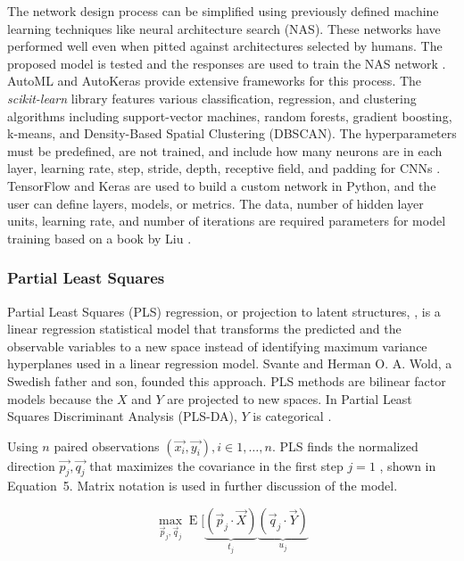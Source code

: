 \documentclass[sn-mathphys-num]{sn-jnl}%
\begin{document}
The network design process can be simplified using previously defined machine learning techniques like neural architecture search (NAS). These networks have performed well even when pitted against architectures selected by humans. The proposed model is tested and the responses are used to train the NAS network \cite{zoph2016neural}. AutoML and AutoKeras \cite{jin2019auto} provide extensive frameworks for this process. The \textit{scikit-learn} library features various classification, regression, and clustering algorithms including support-vector machines, random forests, gradient boosting, k-means, and Density-Based Spatial Clustering (DBSCAN). The hyperparameters must be predefined, are not trained, and include how many neurons are in each layer, learning rate, step, stride, depth, receptive field, and padding for CNNs \cite{claesen2015hyperparameter}. TensorFlow and Keras are used to build a custom network in Python, and the user can define layers, models, or metrics. The data, number of hidden layer units, learning rate, and number of iterations are required parameters for model training based on a book by Liu \cite{liu2020python}.

\subsubsection{Partial Least Squares}

Partial Least Squares (PLS) regression, or projection to latent structures, \cite{wold2001pls, abdi2010partial}, is a linear regression statistical model that transforms the predicted and the observable variables to a new space instead of identifying maximum variance hyperplanes used in a linear regression model. Svante and Herman O. A. Wold, a Swedish father and son, founded this approach. PLS methods are bilinear factor models because the $X$ and $Y$ are projected to new spaces. In Partial Least Squares Discriminant Analysis (PLS-DA), $Y$ is categorical \cite{saebo2008lpls}.

Using $n$ paired observations $\left(\vec{x_{i}}, \vec{y_{i}}\right), i \in 1, \dots, n$. PLS finds the normalized direction $\vec{p_{j}}, \vec{q_{j}}$ that maximizes the covariance in the first step $j = 1$ \cite{youtubeYouTube}, shown in Equation~5. Matrix notation is used in further discussion of the model.

\begin{equation}
	\max_{{\vec{p}}_{j},{\vec{q}}_{j}}\operatorname{E} [\underbrace{({\vec{p}}_{j}\cdot {\vec{X}})}_{t_{j}}\underbrace{({\vec{q}}_{j}\cdot {\vec{Y}})}_{u_{j}}
	\label{eqn:5}
\end{equation}
\end{document}
